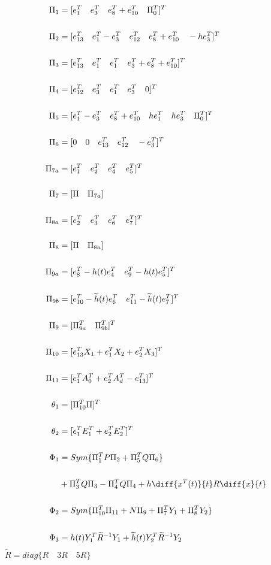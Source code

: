 \documentclass[journal]{IEEEtran}
\begin{document}
 \begin{align}
 \Pi _1 &= [e_1^T \quad e_3^T \quad e_8^T+e_{10}^T \quad \Pi_0^T]^T \\ \\
 \Pi _2 &= [e_{13}^T \quad e_1^T-e_3^T \quad e_{12}^T \quad e_{8}^T+e_{10}^T \quad -he_3^T]^T \\ \\
 \Pi _3 &= [e_{13}^T \quad e_1^T \quad e_{1}^T \quad e_{3}^T+e_{8}^T +e_{10}^T]^T \\ \\
 \Pi _4 &= [e_{12}^T \quad e_3^T \quad e_{1}^T \quad e_{3}^T \quad 0]^T \\ \\
 \Pi _5 &= [e_{1}^T - e_3^T \quad e_{8}^T + e_{10}^T \quad he_{1}^T \quad he_3^T \quad \Pi _0^T]^T \\ \\
 \Pi _6 &= [0 \quad 0 \quad e_{13}^T \quad e_{12}^T \quad -e^T_3]^T \\ \\  
 \Pi _{7a} &= [e_1^T \quad e_2^T \quad e_4^T \quad e_5^T]^T \\ \\
 \Pi _7 &= [\Pi\quad \Pi _{7a} ]\\ \\
 \Pi _{8a} &= [e_2^T \quad e_3^T \quad e_6^T \quad e_7^T]^T \\ \\ 
 \Pi _8 &= [\Pi \quad \Pi _{8a} ] \\ \\
 \Pi _{9a} &= [e_8^T -h(t)e^T_4 \quad e^T_9 - h(t)e^T_5]^T \\ \\
 \Pi _{9b} &= [e_{10}^T -\widetilde{h}(t)e^T_6 \quad e^T_{11} - \widetilde{h}(t)e^T_7]^T \\ \\
 \Pi _{9} &= [\Pi _{9a}^T \quad \Pi _{9b}^T]^T \\ \\
 \Pi _{10} &= [e^T_{13}X_1+e_1^TX_2 + e_2^TX_3]^T \\ \\
 \Pi _{11} &= [e^T_{1}A_0^T+e_2^TA_d^T - e_{13}^T]^T \\ \\
 \theta _1 &= [\Pi _{10}^T \Pi]^T \\ \\
 \theta _2 &= [e_1^TE_1^T + e_2^TE_2^T]^T \\ \\
 \Phi _1 &= Sym\{\Pi _1^TP\Pi _2 + \Pi _5^TQ\Pi  _6\}  \\ \\
         &+ \Pi _3^TQ\Pi _3 - \Pi _4^TQ\Pi _4 + h\diff{x^T(t)}{t}R\diff{x}{t} \\ \\
 \Phi _2 &= Sym\{\Pi _{10}^T\Pi _{11} + N\Pi _{9}+\Pi  _7^TY_1 +\Pi_8^TY_2\}  \\ \\
 \Phi _3 &= h(t)Y_1^T\widetilde{R}^{-1}Y_1+\widetilde{h}(t)Y_2^T\widetilde{R}^{-1}Y_2
 \end{align}
 $\widetilde{R}=diag\{R \quad 3R \quad 5R\}$
\end{document}
